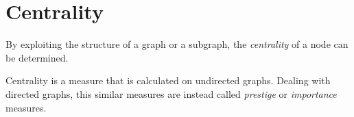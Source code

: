 \begin{comment}
\section{Kernels on a Graph}

Kernels can be used on graphs to capture the similarity between two nodes or between two disjoint subgraphs. The kernel takes all paths into consideration; both indirect and direct paths. They have the property of increasing the element when the number of paths connecting two nodes are many and the length of the paths decreases. 

A kernel is a function that maps two objects to a real number to represent the similarity between the two objects. More precisely, it is a function $k(i,j):\Omega \times \Omega \rightarrow \mathbb{R}$, where the two objects $i,j\in \Omega$ are defined in some input space $\Omega$, that return a similarity measure \cite{fouss2016algorithms}. 

A simple, classical similarity measure is obtained by taking the inner product of the node vectors $x_i$ ans $x_j$. A kernel function is symmetric and positive semidefinite. 

\cite{gartner2008kernels}

\citet{kondor2002diffusionkernels} has defined the exponential diffusion kernel as
\begin{equation}
    \textbf{K} \triangleq \sum_{t=0}^{\infty} \frac{\alpha^t \textbf{A}^t}{t!} = e^{\alpha \textbf{A}}
\end{equation}
where $t$ is the number of transitions away from a specific node, $\textbf{A}$ is the adjacency matrix and the elements $a_{ij}$ represent the direct paths between nodes $i$ and $j$. $\alpha \in (0,1)$ is a discounting factor, where a small value represents small importance of nodes far away, e.g. a high number of transitions away. Thus, the kernel favors shorter paths by giving them a heavier weight.
\end{comment}

\section{Centrality}
By exploiting the structure of a graph or a subgraph, the \textit{centrality} of a node can be determined. 

Centrality is a measure that is calculated on undirected graphs. Dealing with directed graphs, this similar measures are instead called \textit{prestige} or \textit{importance} measures. \cite{fouss2016algorithms}


